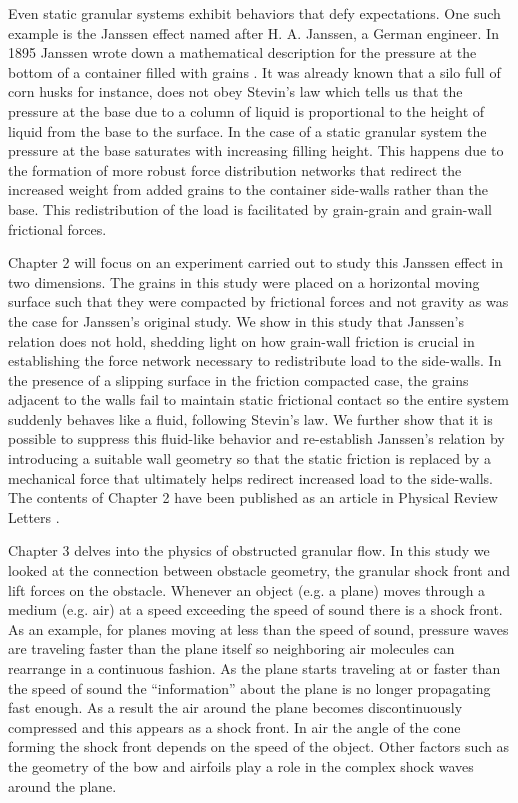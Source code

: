 Even static granular systems exhibit behaviors that defy expectations. One such example is the Janssen effect named after H. A. Janssen, a German engineer. In 1895 Janssen wrote down a mathematical description for the pressure at the bottom of a container filled with grains \cite{janssen_versuche_1895}. It was already known that a silo full of corn husks for instance, does not obey Stevin's law which tells us that the pressure at the base due to a column of liquid is proportional to the height of liquid from the base to the surface. In the case of a static granular system the pressure at the base saturates with increasing filling height. This happens due to the formation of more robust force distribution networks that redirect the increased weight from added grains to the container side-walls rather than the base. This redistribution of the load is facilitated by grain-grain and grain-wall frictional forces. 

Chapter 2 will focus on an experiment carried out to study this Janssen effect in two dimensions. The grains in this study were placed on a horizontal moving surface such that they were compacted by frictional forces and not gravity as was the case for Janssen's original study. We show in this study that Janssen's relation does not hold, shedding light on how grain-wall friction is crucial in establishing the force network necessary to redistribute load to the side-walls. In the presence of a slipping surface in the friction compacted case, the grains adjacent to the walls fail to maintain static frictional contact so the entire system suddenly behaves like a fluid, following Stevin's law. We further show that it is possible to suppress this fluid-like behavior and re-establish Janssen's relation by introducing a suitable wall geometry so that the static friction is replaced by a mechanical force that ultimately helps redirect increased load to the side-walls. The contents of Chapter 2 have been published as an article in Physical Review Letters \cite{karim_corwin}. 

Chapter 3 delves into the physics of obstructed granular flow. In this study we looked at the connection between obstacle geometry, the granular shock front and lift forces on the obstacle. Whenever an object (e.g. a plane) moves through a medium (e.g. air) at a speed exceeding the speed of sound there is a shock front. As an example, for planes moving at less than the speed of sound, pressure waves are traveling faster than the plane itself so neighboring air molecules can rearrange in a continuous fashion. As the plane starts traveling at or faster than the speed of sound the “information” about the plane is no longer propagating fast enough. As a result the air around the plane becomes discontinuously compressed and this appears as a shock front. In air the angle of the cone forming the shock front depends on the speed of the object. Other factors such as the geometry of the bow and airfoils play a role in the complex shock waves around the plane. 

